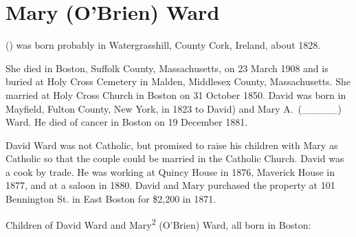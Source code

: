 \section{Mary (O'Brien) Ward}

 () was born probably in Water\-grass\-hill, Coun\-ty Cork, Ireland, about 1828.{\cite{Mary2OBrienMarriage} She died in Boston, Suffolk County, Massachusetts, on 23 March 1908\cite{Mary2OBrienDeath} and is buried at Holy Cross Cemetery in Malden, Middlesex County, Massachusetts.\cite{CarolGordon} She married  at Holy Cross Church in Boston on 31 October 1850.\cite{Mary2OBrienMarriage,Mary2OBrienMarriage2} David was born in Mayfield, Fulton County, New York, in 1823\cite{DavidWardObit} to David) and Mary A.\ (\_\_\_\_\_) Ward.\cite{DavidWardDeath} He died of cancer in Boston on 19 December 1881.\cite{DavidWardDeath}
	
David Ward was not Catholic, but promised to raise his children with Mary as Catholic so that the couple could be married in the Catholic Church.\cite{Mary2OBrienMarriage2} David was a cook by trade. He was working at Quincy House in 1876,\cite{DavidWard1876} Maverick House in 1877,\cite{DavidWard1877} and at a saloon in 1880.\cite{Census1880DavidWard} David and Mary purchased the property at 101 Bennington St. in East Boston for \$2,200 in 1871.\cite{101Bennington,101BenningtonMap}

\begin{KidsIntro}
	Children of David Ward and Mary\textsuperscript{2} (O'Brien) Ward, all born in Boston:
\end{KidsIntro}

}
